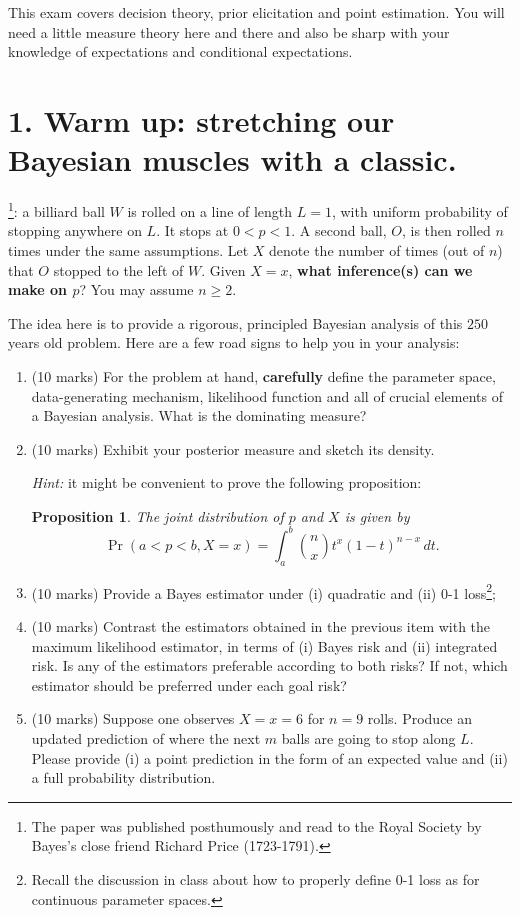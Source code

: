 \documentclass[a4paper,10pt, notitlepage]{report}
\newtheorem{proposition}[thm]{Proposition}
\newcommand{\pr}{\operatorname{Pr}} %
\begin{document}
This exam covers decision theory, prior elicitation and  point estimation.
You will need a little measure theory here and there and also be sharp with your knowledge of expectations and conditional expectations.

\section*{1. Warm up: stretching our Bayesian muscles with a classic.}

\cite{Bayes1763}\footnote{The paper was published posthumously and read to the Royal Society by Bayes's close friend Richard Price (1723-1791).}: a billiard ball $W$ is rolled on a line of length $L = 1$, with uniform probability of stopping anywhere on $L$. 
It stops at $0 < p < 1$.
A second ball, $O$, is then rolled $n$ times under the same assumptions.
Let $X$ denote the number of times (out of $n$) that $O$ stopped to the left of $W$.
Given $X=x$, \textbf{what inference(s) can we make on $p$}?
You may assume $n\geq2$.

The idea here is to provide a rigorous, principled Bayesian analysis of this $250$ years old problem.
Here are a few road signs to help you in your analysis:
\begin{enumerate}[label=\alph*)]
 \item (10 marks) For the problem at hand, \textbf{carefully} define the parameter space, data-generating mechanism, likelihood function and all of crucial elements of a Bayesian analysis. What is the dominating measure?
 \item (10 marks) Exhibit your posterior measure and sketch its density.
 
 \textit{Hint:} it might be convenient to prove the following proposition:
 \begin{proposition}
 \label{prop:joint_bayes}
 The joint distribution of $p$ and $X$ is given by
 \begin{equation*}
  \pr(a < p < b, X = x) = \int_{a}^{b} \binom{n}{x} t^x(1-t)^{n-x}\,dt.
 \end{equation*}
 \end{proposition}
 \item (10 marks) Provide a Bayes estimator under (i) quadratic and (ii) 0-1 loss\footnote{Recall the discussion in class about how to properly define 0-1 loss as for continuous parameter spaces.};
 \item (10 marks) Contrast the estimators obtained in the previous item  with the maximum likelihood estimator, in terms of (i) Bayes risk and (ii) integrated risk.
 Is any of the estimators preferable according to both risks?
 If not, which estimator should be preferred under each goal risk?
 \item (10 marks) Suppose one observes $X = x = 6$ for $n=9$ rolls.
 Produce an updated prediction of where the next $m$ balls are going to stop along $L$.
 Please provide (i) a point prediction in the form of an expected value and (ii) a full probability distribution.
\end{enumerate}
\end{document}
